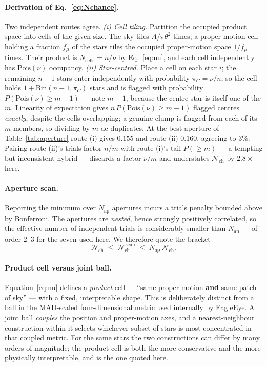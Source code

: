 \documentclass[11pt,a4paper]{article}
\newcommand{\Nchance}{\mathcal{N}_{\mathrm{ch}}}
\begin{document}
\paragraph{Derivation of Eq.~\eqref{eq:Nchance}.}
Two independent routes agree. \emph{(i) Cell tiling.} Partition the occupied
product space into cells of the given size. The sky tiles $A/\pi\theta^{2}$ times;
a proper-motion cell holding a fraction $f_\mu$ of the stars tiles the occupied
proper-motion space $1/f_\mu$ times. Their product is $N_{\mathrm{cells}}=n/\nu$
by Eq.~\eqref{eq:nu}, and each cell independently has $\mathrm{Pois}(\nu)$
occupancy. \emph{(ii) Star-centred.} Place a cell on each star $i$; the remaining
$n-1$ stars enter independently with probability $\pi_C=\nu/n$, so the cell holds
$1+\mathrm{Bin}(n-1,\pi_C)$ stars and is flagged with probability
$P(\mathrm{Pois}(\nu)\ge m-1)$ --- note $m-1$, because the centre star is itself
one of the $m$. Linearity of expectation gives $n\,P(\mathrm{Pois}(\nu)\ge m-1)$
flagged centres \emph{exactly}, despite the cells overlapping; a genuine clump is
flagged from each of its $m$ members, so dividing by $m$ de-duplicates. At the
best aperture of Table~\ref{tab:aperture} route (i) gives $0.155$ and route (ii)
$0.160$, agreeing to $3\%$. Pairing route (ii)'s trials factor $n/m$ with route
(i)'s tail $P(\ge m)$ --- a tempting but inconsistent hybrid --- discards a factor
$\nu/m$ and understates $\Nchance$ by $2.8\times$ here.

\paragraph{Aperture scan.}
Reporting the minimum over $N_{\mathrm{ap}}$ apertures incurs a trials penalty
bounded above by Bonferroni. The apertures are \emph{nested}, hence strongly
positively correlated, so the effective number of independent trials is
considerably smaller than $N_{\mathrm{ap}}$ --- of order $2$--$3$ for the seven
used here. We therefore quote the bracket
%
\begin{equation}
\Nchance \;\le\; \Nchance^{\,\mathrm{scan}} \;\le\; N_{\mathrm{ap}}\,\Nchance .
\label{eq:scanbracket}
\end{equation}

\paragraph{Product cell versus joint ball.}
Equation~\eqref{eq:nu} defines a \emph{product} cell --- ``same proper motion
\textbf{and} same patch of sky'' --- with a fixed, interpretable shape. This is
deliberately distinct from a ball in the MAD-scaled four-dimensional metric used
internally by EagleEye. A joint ball \emph{couples} the position and
proper-motion axes, and a nearest-neighbour construction within it selects
whichever subset of stars is most concentrated in that coupled metric. For the
same stars the two constructions can differ by many orders of magnitude; the
product cell is both the more conservative and the more physically interpretable,
and is the one quoted here.
\end{document}
